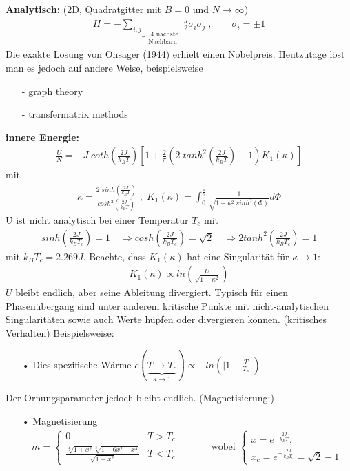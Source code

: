 \documentclass[12pt]{article}
\begin{document}
\textbf{Analytisch:}  (2D, Quadratgitter mit $B=0$ und $N \to \infty$) 
\begin{align}
H= - \underbrace{ \sum_{i,j}}_{\substack{\text{ 4 nächste} \\ \text{Nachbarn}}} \frac{J}{2}\sigma_i \sigma_j \; , \quad \quad \sigma_i=\pm 1
\end{align}
Die exakte Lösung von Onsager (1944) erhielt einen Nobelpreis. Heutzutage löst man es jedoch auf andere Weise, beispielsweise
\begin{itemize}
\item[-] graph theory
\item[-] transfermatrix methods
\end{itemize} 
\textbf{innere Energie:}
\begin{align}
\frac{U}{N}= - J \; coth\left( \frac{2J}{k_BT}\right) \left[ 1 + \frac{2}{\pi} \left( 2 \; tanh^2 \left( \frac{2J}{k_BT} \right) - 1 \right) K_1(\kappa ) \right]
\end{align}
mit
\begin{align}
\kappa= \frac{2 \; sinh \left( \frac{2J}{k_BT} \right)}{cosh^2 \left( \frac{2J}{k_BT} \right) } \; , \; K_1(\kappa)= \int_0^\frac{\pi}{2} \frac{1}{\sqrt{1- \kappa^2 \; sinh^2(\Phi)}} d\Phi
\end{align}
U ist nicht analytisch bei einer Temperatur $T_c$ mit 
\begin{align*}
sinh \left(\frac{2J}{k_BT_c} \right) = 1\quad \Rightarrow cosh \left(\frac{2J}{k_BT_c} \right)= \sqrt{2} \quad \Rightarrow 2 tanh^2\left( \frac{2J}{k_B T_c}\right) =1
\end{align*}
 mit $k_B T_c = 2.269 J$. %
 Beachte, dass $K_1(\kappa)$ hat eine Singularität für $\kappa \to 1$:
 \begin{align*}
 K_1(\kappa) \propto  ln \left( \frac{U}{\sqrt{1-\kappa^2}} \right)
 \end{align*}
 $U$ bleibt endlich, aber seine Ableitung divergiert. Typisch für einen Phasenübergang sind unter anderem kritische Punkte mit nicht-analytischen Singularitäten sowie auch Werte hüpfen oder divergieren können. (kritisches Verhalten) Beispielsweise:
\begin{itemize}
\item[•] Dies spezifische Wärme $c(\underbrace{T \to T_c}_{\kappa \to 1}) \propto - ln \left(\vert 1- \frac{T}{T_c}\vert \right)$
\end{itemize}
Der Ornungsparameter jedoch bleibt endlich. (Magnetisierung:)
\begin{itemize}
\item[•] Magnetisierung 
\begin{align}
m=
\begin{cases}
0 & T>T_c \\
\frac{\sqrt[4]{1+x^2} \sqrt[8]{1-6x^2 +x^4} }{\sqrt{1-x^2}}& T<T_c
\end{cases} \quad \quad \quad \mbox{ wobei } 
\begin{cases}
x= e^{- \frac{2J}{k_B T}}, \\
 x_c=  e^{- \frac{2J}{k_B T_c}} = \sqrt{2} -1
 \end{cases}
\end{align}
\end{itemize}
\end{document}
